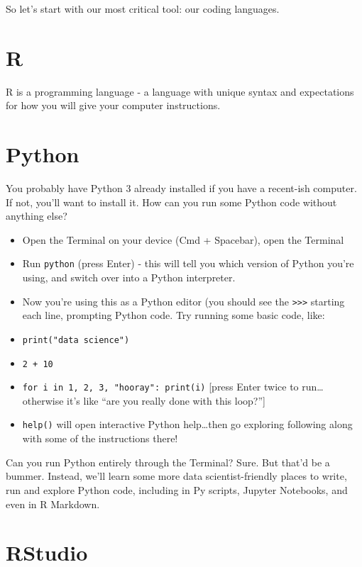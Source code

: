 \documentclass[
]{book}
\begin{document}
So let's start with our most critical tool: our coding languages.

\hypertarget{r}{%
\section{R}\label{r}}

R is a programming language - a language with unique syntax and expectations for how you will give your computer instructions.

\hypertarget{python}{%
\section{Python}\label{python}}

You probably have Python 3 already installed if you have a recent-ish computer. If not, you'll want to install it. How can you run some Python code without anything else?

\begin{itemize}
\item
  Open the Terminal on your device (Cmd + Spacebar), open the Terminal
\item
  Run \texttt{python} (press Enter) - this will tell you which version of Python you're using, and switch over into a Python interpreter.
\item
  Now you're using this as a Python editor (you should see the \texttt{\textgreater{}\textgreater{}\textgreater{}} starting each line, prompting Python code. Try running some basic code, like:
\item
  \texttt{print("data\ science")}
\item
  \texttt{2\ +\ 10}
\item
  \texttt{for\ i\ in\ 1,\ 2,\ 3,\ "hooray":\ print(i)} {[}press Enter twice to run\ldots otherwise it's like ``are you really done with this loop?''{]}
\item
  \texttt{help()} will open interactive Python help\ldots then go exploring following along with some of the instructions there!
\end{itemize}

Can you run Python entirely through the Terminal? Sure. But that'd be a bummer. Instead, we'll learn some more data scientist-friendly places to write, run and explore Python code, including in Py scripts, Jupyter Notebooks, and even in R Markdown.

\hypertarget{rstudio}{%
\section{RStudio}\label{rstudio}}
\end{document}
